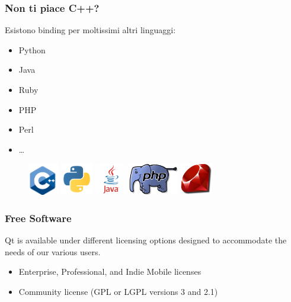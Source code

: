 \documentclass[10pt, aspectratio=169]{beamer}
\begin{document}
\begin{frame}
	\frametitle{Non ti piace C++?}
	\begin{block}{}
		Esistono binding per moltissimi altri linguaggi:
		\begin{itemize}
			\item Python
			\item Java
			\item Ruby
			\item PHP
			\item Perl
			\item \dots
		\end{itemize}
	\end{block}
	\vspace{0.5cm}
	\begin{figure}
		\includegraphics[height=1.4cm]{images/cplusplus.png}
		\qquad
		\includegraphics[height=1.4cm]{images/python.png}
		\qquad
		\includegraphics[height=1.4cm]{images/java.png}
		\qquad
		\includegraphics[height=1.4cm]{images/php.png}
		\qquad
		\includegraphics[height=1.4cm]{images/ruby.png}
	\end{figure}	
\end{frame}

\begin{frame}
	\frametitle{Free Software}
	Qt is available under different licensing options designed to accommodate the needs of our various users.
	\begin{itemize}
		\item Enterprise, Professional, and Indie Mobile licenses
		\item Community license (GPL or LGPL versions 3 and 2.1)
	\end{itemize}
\end{frame}
\end{document}
